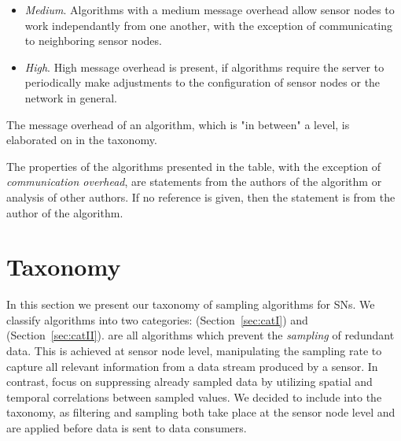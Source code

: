 \begin{description}
\begin{itemize}
            \item \textit{Medium}. Algorithms with a medium message overhead
            allow sensor nodes to work independantly from one another, with the
            exception of communicating to neighboring sensor nodes.

            \item \textit{High}. High message overhead is present, if
            algorithms require the server to periodically make adjustments to
            the configuration of sensor nodes or the network in general.
        \end{itemize}

        The message overhead of an algorithm, which is "in between" a level, is
        elaborated on in the taxonomy.

        The properties of the algorithms presented in the table, with the
        exception of \textit{communication overhead}, are statements from the
        authors of the algorithm or analysis of other authors. If no reference
        is given, then the statement is from the author of the algorithm.

\end{description}


\section{Taxonomy}
\label{sec:Taxonomy}

In this section we present our taxonomy of sampling algorithms for \acp{SN}. We
classify algorithms into two categories: \catI (Section~\ref{sec:catI}) and
\catII (Section~\ref{sec:catII}). \catI are all algorithms which prevent the
\textit{sampling} of redundant data. This is achieved at sensor node level,
manipulating the sampling rate to capture all relevant information from a data
stream produced by a sensor. In contrast, \catII focus on suppressing already
sampled data by utilizing spatial and temporal correlations between sampled
values. We decided to include \catII into the taxonomy, as filtering and
sampling both take place at the sensor node level and are applied before data
is sent to data consumers.



